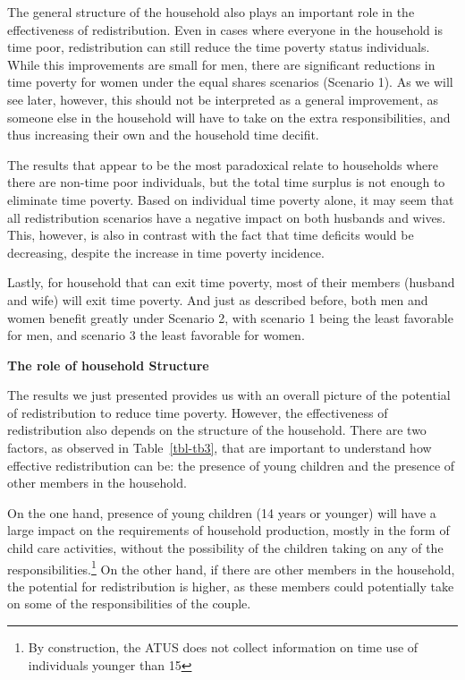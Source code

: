 \documentclass[
  11pt,
]{article}
\begin{document}
The general structure of the household also plays an important role in
the effectiveness of redistribution. Even in cases where everyone in the
household is time poor, redistribution can still reduce the time poverty
status individuals. While this improvements are small for men, there are
significant reductions in time poverty for women under the equal shares
scenarios (Scenario 1). As we will see later, however, this should not
be interpreted as a general improvement, as someone else in the
household will have to take on the extra responsibilities, and thus
increasing their own and the household time decifit.

The results that appear to be the most paradoxical relate to households
where there are non-time poor individuals, but the total time surplus is
not enough to eliminate time poverty. Based on individual time poverty
alone, it may seem that all redistribution scenarios have a negative
impact on both husbands and wives. This, however, is also in contrast
with the fact that time deficits would be decreasing, despite the
increase in time poverty incidence.

Lastly, for household that can exit time poverty, most of their members
(husband and wife) will exit time poverty. And just as described before,
both men and women benefit greatly under Scenario 2, with scenario 1
being the least favorable for men, and scenario 3 the least favorable
for women.

\textbf{The role of household Structure}

The results we just presented provides us with an overall picture of the
potential of redistribution to reduce time poverty. However, the
effectiveness of redistribution also depends on the structure of the
household. There are two factors, as observed in Table~\ref{tbl-tb3},
that are important to understand how effective redistribution can be:
the presence of young children and the presence of other members in the
household.

On the one hand, presence of young children (14 years or younger) will
have a large impact on the requirements of household production, mostly
in the form of child care activities, without the possibility of the
children taking on any of the responsibilities.\footnote{By
  construction, the ATUS does not collect information on time use of
  individuals younger than 15} On the other hand, if there are other
members in the household, the potential for redistribution is higher, as
these members could potentially take on some of the responsibilities of
the couple.
\end{document}
